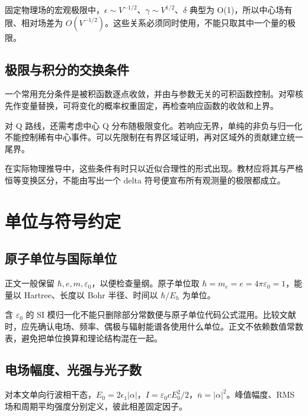 \documentclass[UTF8,a4paper,zihao=-4,openany,fontset=fandol]{ctexbook}
\begin{document}
固定物理场的宏观极限中，$\epsilon\sim V^{-1/2}$、$\gamma\sim V^{1/2}$、$\delta$ 典型为 O(1)，所以中心场有限、相对场差为 $O(V^{-1/2})$。这些关系必须同时使用，不能只取其中一个量的极限。



\section{极限与积分的交换条件}\label{sec:B:6}


一个常用充分条件是被积函数逐点收敛，并由与参数无关的可积函数控制。对窄核先作变量替换，可将变化的概率权重固定，再检查响应函数的收敛和上界。



对 Q 路线，还需考虑中心 Q 分布随极限变化。若响应无界，单纯的非负与归一化不能控制稀有中心事件。可以先限制在有界区域证明，再对区域外的贡献建立统一尾界。



在实际物理推导中，这些条件有时只以近似合理性的形式出现。教材应将其与严格恒等变换区分，不能由写出一个 delta 符号便宣布所有观测量的极限都成立。



\chapter{单位与符号约定}\label{ch:C}


\section{原子单位与国际单位}\label{sec:C:1}


正文一般保留 $\hbar,e,m,\varepsilon_0$，以便检查量纲。原子单位取 $\hbar=m_e=e=4\pi\varepsilon_0=1$，能量以 Hartree、长度以 Bohr 半径、时间以 $\hbar/E_h$ 为单位。



含 $\varepsilon_0$ 的 SI 模归一化不能只删除部分常数便与原子单位代码公式混用。比较文献时，应先确认电场、频率、偶极与辐射能谱各使用什么单位。正文不依赖数值常数表，避免把单位换算和理论结构混在一起。



\section{电场幅度、光强与光子数}\label{sec:C:2}


对本文单向行波相干态，$E_0=2\epsilon_1|\alpha|$，$I=\varepsilon_0cE_0^2/2$，$\bar n=|\alpha|^2$。峰值幅度、RMS 场和周期平均强度分别定义，彼此相差固定因子。
\end{document}
